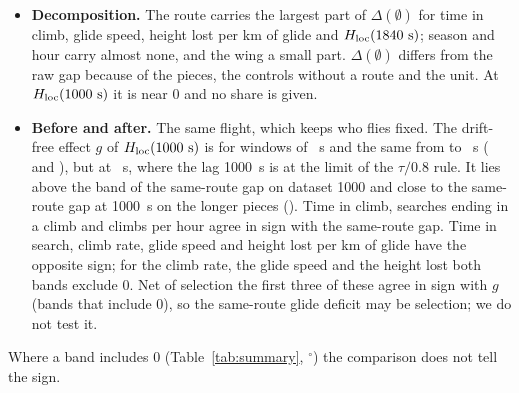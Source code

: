 \begin{itemize}
  \item \textbf{Decomposition.} The route carries the largest part of $\Delta(\emptyset)$ for time in climb, glide speed, height lost per km of glide and $H_\mathrm{loc}(1840~\mathrm{s})$; season and hour carry almost none, and the wing a small part. $\Delta(\emptyset)$ differs from the raw gap
  because of the pieces, the controls without a route and the unit. At $H_\mathrm{loc}(1000~\mathrm{s})$ it is near 0 and no share is given.
  \item \textbf{Before and after.} The same flight, which keeps who flies fixed. The drift-free effect $g$ of $H_\mathrm{loc}(1000~\mathrm{s})$ is \PreGHK{} \PreGHKBand{} for windows of \PreWinCLen~s and the same from \PreWinBLen{} to \PreWinDLen~s (\PreWinBHK{} and \PreWinDHK), but \PreWinAHK{} at \PreWinALen~s, where the lag 1000~s is at the limit of the $\tau/0.8$ rule. It lies above the band of the same-route gap on dataset 1000 and close to the same-route gap at 1000~s on the longer pieces (\MatDeltaHKLongG). Time in climb, searches ending in a climb and climbs per hour
  agree in sign with the same-route gap. Time in search, climb rate, glide speed and height lost per km of glide have the opposite sign; for the climb rate, the glide speed and the height lost both bands exclude 0. Net of selection the first three of these agree in sign with $g$ (bands that include 0), so the same-route glide deficit may be selection; we do not test it.
\end{itemize}

\noindent Where a band includes 0 (Table~\ref{tab:summary}, $^\circ$) the comparison does not tell the sign.
